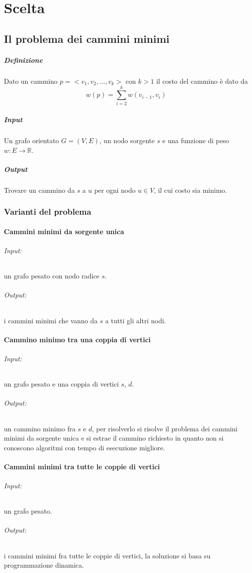 \chapter{Scelta}
\section{Il problema dei cammini minimi}
	\paragraph{Definizione}
	Dato un cammino $p=<v_1, v_2, \dots, v_k>$ con $k>1$ il costo del cammino \`e dato da $$w(p) =
		\sum\limits_{i =2}^k w(v_{i-1}, v_i)$$
	\paragraph{Input} Un grafo orientato $G = (V, E)$, un nodo sorgente $s$ e una funzione di peso $w:
		E\rightarrow \mathbb{R}$.
	\paragraph{Output} Trovare un cammino da $s$ a $u$ per ogni nodo $u\in V$, il cui costo sia minimo.
	\subsection{Varianti del problema}
	\subsubsection{Cammini minimi da sorgente unica}
	\subparagraph{Input:} un grafo pesato con nodo radice $s$.
	\subparagraph{Output:} i cammini minimi che vanno da $s$ a tutti gli altri nodi.
	\subsubsection{Cammino minimo tra una coppia di vertici}
	\subparagraph{Input:} un grafo pesato e una coppia di vertici $s$, $d$.
	\subparagraph{Output:} un cammino minimo fra $s$ e $d$, per risolverlo si risolve il problema dei cammini minimi da
	sorgente unica e si estrae il cammino richiesto in quanto non si conoscono algoritmi con tempo di
	esecuzione migliore.
	\subsubsection{Cammini minimi tra tutte le coppie di vertici}
	\subparagraph{Input:} un grafo pesato.
	\subparagraph{Output:} i cammini minimi fra tutte le coppie di vertici, la soluzione si basa su programmazione dinamica.
